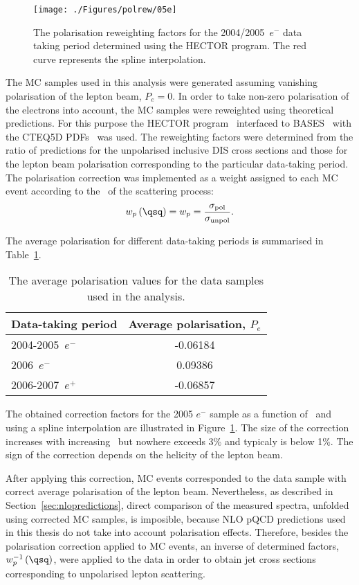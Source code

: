 \label{sec:polcor}
\begin{figure}[h]
 \begin{center}
 \texttt{[image: ./Figures/polrew/05e]}
\end{center}
\caption{The polarisation reweighting factors for the 2004/2005~$e^-$ data taking period determined using the HECTOR program. The red curve represents the spline interpolation.}
\label{fig:polcor05e}
\end{figure} 
The MC samples used in this analysis were generated assuming vanishing polarisation of the lepton beam, $P_e = 0$. In order to take non-zero polarisation of the electrons into account, the MC samples were reweighted using theoretical predictions. For this purpose the HECTOR program~\cite{cpc:94:128} interfaced to BASES~\cite{upub:Nagano:url} with the CTEQ5D PDFs~\cite{pr:d51:4763} was used. The reweighting factors were determined from the ratio of predictions for the unpolarised inclusive DIS cross sections and those for the lepton beam polarisation corresponding to the particular data-taking period. The polarisation correction was implemented as a weight assigned to each MC event according to the \qsq~of the scattering process:
\begin{equation}
 w_p\left(\qsq\right) = w_p = \frac{\sigma_\mathrm{pol}}{\sigma_\mathrm{unpol}}.
\end{equation}

The average polarisation for different data-taking periods is summarised in Table~\ref{tab:polvalues}.
\begin{table}[h]
 \centering
 \begin{tabular}{lc}
 Data-taking period & Average polarisation, $P_e$ \\
\hline
 2004-2005~$e^-$   & -0.06184 \\
 2006~$e^-$   & 0.09386  \\
 2006-2007~$e^+$ & -0.06857
\end{tabular} 
\caption{The average polarisation values for the data samples used in the analysis.}
\label{tab:polvalues}
\end{table}
The obtained correction factors for the 2005 $e^-$ sample as a function of \qsq~and using a spline interpolation are illustrated in Figure~\ref{fig:polcor05e}. The size of the correction increases with increasing \qsq~but nowhere exceeds 3\% and typicaly is below 1\%. The sign of the correction depends on the helicity of the lepton beam.

After applying this correction, MC events corresponded to the data sample with correct average polarisation of the lepton beam. Nevertheless, as described in Section~\ref{sec:nlopredictions}, direct comparison of the measured spectra, unfolded using corrected MC samples, is imposible, because NLO pQCD predictions used in this thesis do not take into account polarisation effects. Therefore, besides the polarisation correction applied to MC events, an inverse of determined factors, $w_p^{-1}\left(\qsq\right)$, were applied to the data in order to obtain jet cross sections corresponding to unpolarised lepton scattering.